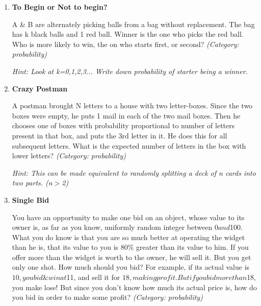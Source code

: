 \begin{enumerate}
\item \textbf{To Begin or Not to begin?}

A \& B are alternately picking balls from a bag without replacement. The bag has k black balls and 1 red ball. Winner is the one who picks the red ball. Who is more likely to win, the on who starts first, or second?
\small\emph{(Category: probability)}

\small\emph{Hint: Look at k=0,1,2,3... Write down probability of starter being a winner.}





\item \textbf{Crazy Postman}

A postman brought N letters to a house with two letter-boxes. Since the two boxes were empty, he puts 1 mail in each of the two mail boxes. Then he chooses one of boxes with probability proportional to number of letters present in that box, and puts the 3rd letter in it. He does this for all subsequent letters. What is the expected number of letters in the box with lower letters?
\small\emph{(Category: probability)}

\small\emph{Hint: This can be made equivalent to randomly splitting a deck of n cards into two parts. (n$>$2)}





\item \textbf{Single Bid}

You have an opportunity to make one bid on an object, whose value to its owner is, as far as you know, uniformly random integer between $0 and $100. What you do know is that you are so much better at operating the widget than he is, that its value to you is 80\% greater than its value to him. If you offer more than the widget is worth to the owner, he will sell it. But you get only one shot. How much should you bid? For example, if its actual value is $10, you bid \& win at $11, and sell it for $18, making profit. But if you bid more than $18, you make lose! But since you don't know how much its actual price is, how do you bid in order to make some profit?
\small\emph{(Category: probability)}


\end{enumerate}
